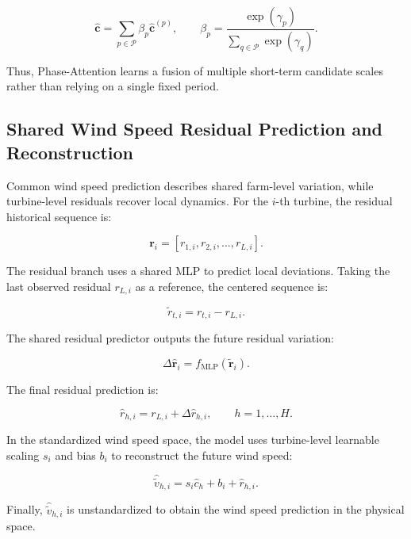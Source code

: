 \begin{equation}
\hat{\mathbf{c}} = \sum_{p\in\mathcal{P}} \beta_p\hat{\mathbf{c}}^{(p)}, \qquad \beta_p = \frac{\exp(\gamma_p)}{\sum_{q\in\mathcal{P}}\exp(\gamma_q)}.
\end{equation}

Thus, Phase-Attention learns a fusion of multiple short-term candidate scales rather than relying on a single fixed period.

\subsection{Shared Wind Speed Residual Prediction and Reconstruction}

Common wind speed prediction describes shared farm-level variation, while turbine-level residuals recover local dynamics. For the $i$-th turbine, the residual historical sequence is:

\begin{equation}
\mathbf{r}_i = [r_{1,i}, r_{2,i}, \ldots, r_{L,i}].
\end{equation}

The residual branch uses a shared MLP to predict local deviations. Taking the last observed residual $r_{L,i}$ as a reference, the centered sequence is:

\begin{equation}
\widetilde{r}_{t,i} = r_{t,i}-r_{L,i}.
\end{equation}

The shared residual predictor outputs the future residual variation:

\begin{equation}
\Delta\hat{\mathbf{r}}_i = f_{\mathrm{MLP}} \left( \widetilde{\mathbf{r}}_i \right).
\end{equation}

The final residual prediction is:

\begin{equation}
\hat{r}_{h,i} = r_{L,i} + \Delta\hat{r}_{h,i}, \qquad h=1,\ldots,H.
\end{equation}

In the standardized wind speed space, the model uses turbine-level learnable scaling $s_i$ and bias $b_i$ to reconstruct the future wind speed:

\begin{equation}
\hat{\tilde{v}}_{h,i} = s_i\hat{c}_h + b_i + \hat{r}_{h,i}.
\end{equation}

Finally, $\hat{\tilde{v}}_{h,i}$ is unstandardized to obtain the wind speed prediction in the physical space.

